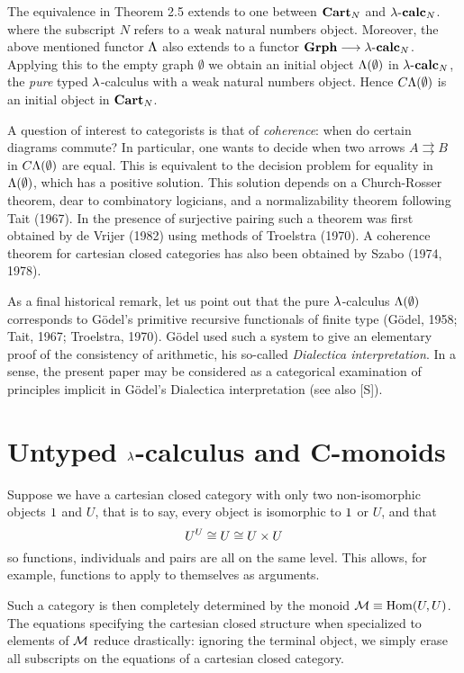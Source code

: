 The equivalence in Theorem 2.5 extends to one between
$\text{\bf Cart}_N$ and $\lambda\text{-{\bf{\kern 0.2pt}calc}}_N$.
where the subscript $N$ refers to a weak natural numbers object.
Moreover, the above mentioned functor $\Lambda$ also extends to a functor
${\mathbf {Grph}} \longrightarrow \lambda\text{-{\bf{\kern 0.2pt}calc}}_N$. Applying this to the empty graph $\emptyset$
we obtain an initial object $\Lambda(\emptyset)$ in $\lambda\text{-{\bf{\kern 0.2pt}calc}}_N$, the {\em pure}
typed $\lambda$-calculus with a weak natural numbers object.
Hence $C\Lambda(\emptyset)$ is an initial object in $\text{\bf Cart}_N$.

A question of interest to categorists is that of {\em coherence}: when do
certain diagrams commute? In particular, one wants to decide when two arrows
$A \rightrightarrows B$ in $C\Lambda(\emptyset)$ are equal.
This is equivalent to the decision problem for
equality in $\Lambda(\emptyset)$, which has a positive solution. This solution depends on a
Church-Rosser theorem, dear to combinatory logicians, and a normalizability
theorem following Tait (1967). In the presence of surjective pairing such a
theorem was first obtained by de Vrijer (1982) using methods of Troelstra
(1970). A coherence theorem for cartesian closed categories has also been
obtained by Szabo (1974, 1978).

As a final historical remark, let us point out that the pure $\lambda$-calculus
$\Lambda(\emptyset)$ corresponds to G\"odel's primitive recursive functionals of finite type
(G\"odel, 1958; Tait, 1967; Troelstra, 1970). G\"odel used such a system to give
an elementary proof of the consistency of arithmetic, his so-called {\em Dialectica
interpretation}. In a sense, the present paper may be considered as a
categorical examination of principles implicit in G\"odel's Dialectica
interpretation (see also [S]).

\section{Untyped $\lambda$-calculus and C-monoids}

Suppose we have a cartesian closed category with only two non-isomorphic
objects $1$ and $U$, that is to say, every object is isomorphic to $1$ or $U$,
and that
\[
U^{U} \cong U \cong U \times U
\]
so functions, individuals and pairs are all on the same level. This allows,
for example, functions to apply to themselves as arguments.

Such a category is then completely determined by the monoid ${\mathcal M} \equiv \operatorname{{Hom}}(U,U)$.
The equations specifying the cartesian closed structure when specialized to
elements of ${\mathcal M}$ reduce drastically: ignoring the terminal object, we simply
erase all subscripts on the equations of a cartesian closed category.

